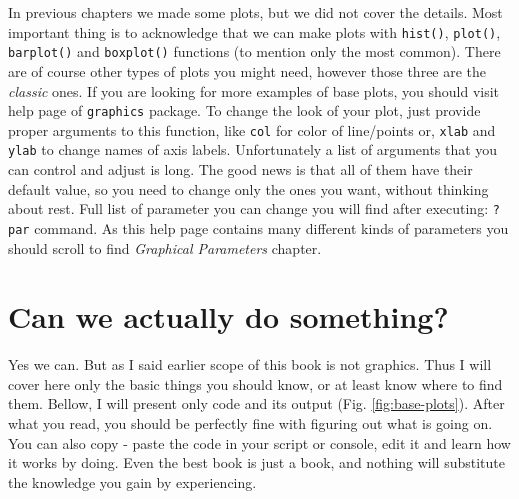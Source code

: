 \documentclass[]{book}
\theoremstyle{definition}
\theoremstyle{definition}
\theoremstyle{definition}
\theoremstyle{remark}
\begin{document}
In previous chapters we made some plots, but we did not cover the
details. Most important thing is to acknowledge that we can make plots
with \texttt{hist()}, \texttt{plot()}, \texttt{barplot()} and
\texttt{boxplot()} functions (to mention only the most common). There
are of course other types of plots you might need, however those three
are the \emph{classic} ones. If you are looking for more examples of
base plots, you should visit help page of \texttt{graphics} package. To
change the look of your plot, just provide proper arguments to this
function, like \texttt{col} for color of line/points or, \texttt{xlab}
and \texttt{ylab} to change names of axis labels. Unfortunately a list
of arguments that you can control and adjust is long. The good news is
that all of them have their default value, so you need to change only
the ones you want, without thinking about rest. Full list of parameter
you can change you will find after executing: \texttt{?par} command. As
this help page contains many different kinds of parameters you should
scroll to find \emph{Graphical Parameters} chapter.

\section{Can we actually do
something?}\label{can-we-actually-do-something}

Yes we can. But as I said earlier scope of this book is not graphics.
Thus I will cover here only the basic things you should know, or at
least know where to find them. Bellow, I will present only code and its
output (Fig. \ref{fig:base-plots}). After what you read, you should be
perfectly fine with figuring out what is going on. You can also copy -
paste the code in your script or console, edit it and learn how it works
by doing. Even the best book is just a book, and nothing will substitute
the knowledge you gain by experiencing.
\end{document}
